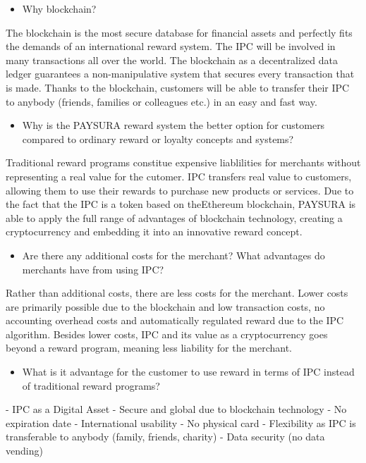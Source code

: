 \documentclass[twoside,onecolumn]{article}
\begin{document}
\begin{itemize}
\item Why blockchain?
\end{itemize}

The blockchain is the most secure database for financial assets and perfectly fits the demands of an international reward system. The IPC will be involved in many transactions all over the world. The blockchain as a decentralized data ledger guarantees a non-manipulative system that secures every transaction that is made. Thanks to the blockchain, customers will be able to transfer their IPC to anybody (friends, families or colleagues etc.) in an easy and fast way. 


\begin{itemize}
\item Why is the PAYSURA reward system the better option for customers compared to ordinary reward or loyalty concepts and systems?
\end{itemize}

Traditional reward programs constitue expensive liablilities for merchants without representing a real value for the cutomer. IPC transfers real value to customers, allowing them to use their rewards to purchase new products or services. Due to the fact that the IPC is a token based on theEthereum blockchain, PAYSURA is able to apply the full range of advantages of blockchain technology, creating a cryptocurrency and embedding it into an innovative reward concept.

\begin{itemize}
\item Are there any additional costs for the merchant? What advantages do merchants have from using IPC?
\end{itemize}  
Rather than additional costs, there are less costs for the merchant. Lower costs are primarily possible due to the blockchain and low transaction costs, no accounting overhead costs and automatically regulated reward due to the IPC algorithm. Besides lower costs, IPC and its value as a cryptocurrency goes beyond a reward program, meaning less liability for the merchant.

\begin{itemize}
\item What is it advantage for the customer to use reward in terms of IPC instead of traditional reward programs?
\end{itemize}

- IPC as a Digital Asset \newline
- Secure and global due to blockchain technology \newline
- No expiration date \newline
- International usability \newline
- No physical card \newline
- Flexibility as IPC is transferable to anybody (family, friends, charity) \newline
- Data security (no data vending)\newline
\end{document}
